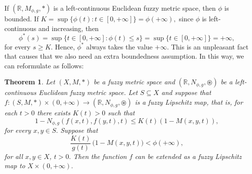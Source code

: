 \documentclass[12pt]{amsart}
\newtheorem{theorem}{Theorem}
\begin{document}
	If $(\mathbb{R},M_{\phi,g},\ast)$ is a left-continuous Euclidean fuzzy metric space, then $\phi$ is bounded. If $K=\sup\{\phi(t):t\in [0,+\infty]\}=\phi(+\infty),$ since $\phi$ is left-continuous and increasing, then 
	$$\phi^*(s)=\sup\{t\in [0,+\infty]:\phi(t)\leq s\}=\sup \{t\in [0,+\infty]\}=+\infty,$$
	for every $s\geq K.$ Hence, $\phi^*$ always takes the value $+\infty.$ This is an unpleasant fact that causes that we also need an extra boundedness assumption. 
	In this way, we can reformulate \cite[Theorem 21]{JFRLSP21} as follows:
	
	
	\begin{theorem} \label{mainth}
		Let $(X,M,\ast)$ be a fuzzy metric space and $(\mathbb{R},N_{\phi,g},\circledast)$ be a left-continuous Euclidean fuzzy metric space. Let $S\subseteq X$ and suppose that  $f:(S,M,\ast) \times (0,+\infty) \to  (\mathbb R, N_{\phi,g},  \circledast)$
		is a fuzzy Lipschitz map, that is, for each $t>0$ there exists $K(t)>0$ such that 
		$$1 - N_{\phi,g}( f (x,t), f (y,t), t)\leq K(t)(1 - M(x, y, t)),$$
		for every $x,y\in S.$
		Suppose that 
		$$\frac{K(t)}{g(t)} \, \big( 1- M(x,y,t) \big)< \phi(+\infty),$$
		for all $x,y\in X$, $t>0.$ 	Then the function $f$ can be extended as a fuzzy Lipschitz map to $X \times (0,+\infty).$
	\end{theorem}
	
\end{document}
